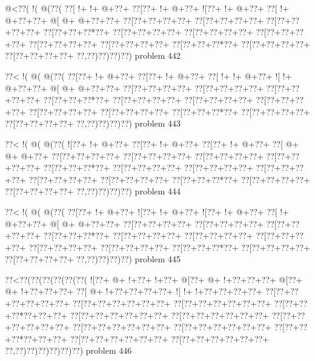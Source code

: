 \vbox{\vbox{\goo
\- @<\0??(\- !(\- @(\0??(
\0??[\- !+\- !+\- @+\0??+
\0??[\0??+\- !+\- @+\0??+
\- ![\0??+\- !+\- @+\0??+
\0??[\- !+\- @+\0??+\0??+
\- @[\- @+\- @+\0??+\0??+
\0??[\0??+\0??+\0??+\0??+
\0??[\0??+\0??+\0??+\0??+
\0??[\0??+\0??+\0??+\0??+
\0??[\0??+\0??+\0??*\0??+
\0??[\0??+\0??+\0??+\0??+
\0??[\0??+\0??+\0??+\0??+
\0??[\0??+\0??+\0??+\0??+
\0??[\0??+\0??+\0??+\0??+
\0??[\0??+\0??+\0??+\0??+
\0??[\0??+\0??+\0??*\0??+
\0??[\0??+\0??+\0??+\0??+
\0??[\0??+\0??+\0??+\0??+
\0??,\0??)\0??)\0??)\0??)
}
\hfil problem 442\hfil\break
}

\vbox{\vbox{\goo
\0??<\- !(\- @(\- @(\0??(
\0??[\0??+\- !+\- @+\0??+
\0??[\0??+\- !+\- @+\0??+
\0??[\- !+\- !+\- @+\0??+
\- ![\- !+\- @+\0??+\0??+
\- @[\- @+\- @+\0??+\0??+
\0??[\0??+\0??+\0??+\0??+
\0??[\0??+\0??+\0??+\0??+
\0??[\0??+\0??+\0??+\0??+
\0??[\0??+\0??+\0??*\0??+
\0??[\0??+\0??+\0??+\0??+
\0??[\0??+\0??+\0??+\0??+
\0??[\0??+\0??+\0??+\0??+
\0??[\0??+\0??+\0??+\0??+
\0??[\0??+\0??+\0??+\0??+
\0??[\0??+\0??+\0??*\0??+
\0??[\0??+\0??+\0??+\0??+
\0??[\0??+\0??+\0??+\0??+
\0??,\0??)\0??)\0??)\0??)
}
\hfil problem 443\hfil\break
}

\vbox{\vbox{\goo
\0??<\- !(\- @(\- @(\0??(
\- ![\0??+\- !+\- @+\0??+
\0??[\0??+\- !+\- @+\0??+
\0??[\0??+\- !+\- @+\0??+
\0??[\- @+\- @+\- @+\0??+
\0??[\0??+\0??+\0??+\0??+
\0??[\0??+\0??+\0??+\0??+
\0??[\0??+\0??+\0??+\0??+
\0??[\0??+\0??+\0??+\0??+
\0??[\0??+\0??+\0??*\0??+
\0??[\0??+\0??+\0??+\0??+
\0??[\0??+\0??+\0??+\0??+
\0??[\0??+\0??+\0??+\0??+
\0??[\0??+\0??+\0??+\0??+
\0??[\0??+\0??+\0??+\0??+
\0??[\0??+\0??+\0??*\0??+
\0??[\0??+\0??+\0??+\0??+
\0??[\0??+\0??+\0??+\0??+
\0??,\0??)\0??)\0??)\0??)
}
\hfil problem 444\hfil\break
}

\vbox{\vbox{\goo
\0??<\- !(\- @(\- @(\0??(
\0??[\0??+\- !+\- @+\0??+
\- ![\0??+\- !+\- @+\0??+
\- ![\0??+\- !+\- @+\0??+
\0??[\- !+\- @+\0??+\0??+
\- @[\- @+\- @+\0??+\0??+
\0??[\0??+\0??+\0??+\0??+
\0??[\0??+\0??+\0??+\0??+
\0??[\0??+\0??+\0??+\0??+
\0??[\0??+\0??+\0??*\0??+
\0??[\0??+\0??+\0??+\0??+
\0??[\0??+\0??+\0??+\0??+
\0??[\0??+\0??+\0??+\0??+
\0??[\0??+\0??+\0??+\0??+
\0??[\0??+\0??+\0??+\0??+
\0??[\0??+\0??+\0??*\0??+
\0??[\0??+\0??+\0??+\0??+
\0??[\0??+\0??+\0??+\0??+
\0??,\0??)\0??)\0??)\0??)
}
\hfil problem 445\hfil\break
}

\vbox{\vbox{\goo
\0??<\0??(\0??(\0??(\0??(\0??(\0??(
\- ![\0??+\- @+\- !+\0??+\- !+\0??+
\- @[\0??+\- @+\- !+\0??+\0??+\0??+
\- @[\0??+\- @+\- !+\0??+\0??+\0??+
\0??[\- @+\- !+\0??+\0??+\0??+\0??+
\- ![\- !+\- !+\0??+\0??+\0??+\0??+
\0??[\0??+\0??+\0??+\0??+\0??+\0??+
\0??[\0??+\0??+\0??+\0??+\0??+\0??+
\0??[\0??+\0??+\0??+\0??+\0??+\0??+
\0??[\0??+\0??+\0??*\0??+\0??+\0??+
\0??[\0??+\0??+\0??+\0??+\0??+\0??+
\0??[\0??+\0??+\0??+\0??+\0??+\0??+
\0??[\0??+\0??+\0??+\0??+\0??+\0??+
\0??[\0??+\0??+\0??+\0??+\0??+\0??+
\0??[\0??+\0??+\0??+\0??+\0??+\0??+
\0??[\0??+\0??+\0??*\0??+\0??+\0??+
\0??[\0??+\0??+\0??+\0??+\0??+\0??+
\0??[\0??+\0??+\0??+\0??+\0??+\0??+
\0??,\0??)\0??)\0??)\0??)\0??)\0??)
}
\hfil problem 446\hfil\break
}

